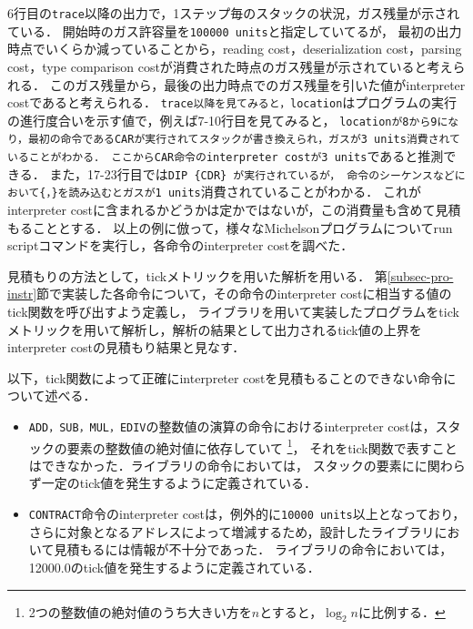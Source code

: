 \documentclass{kuisthesis}
\begin{document}
6行目の{\tt trace}以降の出力で，1ステップ毎のスタックの状況，ガス残量が示されている．
開始時のガス許容量を{\tt 100000\ units}と指定していてるが，
最初の出力時点でいくらか減っていることから，reading cost，deserialization cost，parsing cost，type comparison costが消費された時点のガス残量が示されていると考えられる．
このガス残量から，最後の出力時点でのガス残量を引いた値がinterpreter costであると考えられる．
{\tt trace以降を見てみると，location}はプログラムの実行の進行度合いを示す値で，例えば7-10行目を見てみると，
{\tt locationが8から9になり，最初の命令であるCARが実行されてスタックが書き換えられ，ガスが3\ units消費されていることがわかる．
ここからCAR命令のinterpreter costが3\ units}であると推測できる．
また，17-23行目では{\tt DIP \{CDR\} が実行されているが，
命令のシーケンスなどにおいて\{，\}を読み込むとガスが1\ units}消費されていることがわかる．
これがinterpreter costに含まれるかどうかは定かではないが，この消費量も含めて見積もることとする．
以上の例に倣って，様々なMichelsonプログラムについてrun scriptコマンドを実行し，各命令のinterpreter costを調べた．

見積もりの方法として，tickメトリックを用いた解析を用いる．
第\ref{subsec-pro-instr}節で実装した各命令について，その命令のinterpreter costに相当する値のtick関数を呼び出すよう定義し，
ライブラリを用いて実装したプログラムをtickメトリックを用いて解析し，解析の結果として出力されるtick値の上界をinterpreter costの見積もり結果と見なす．

以下，tick関数によって正確にinterpreter costを見積もることのできない命令について述べる．
\begin{itemize}
  \item {\tt ADD，SUB，MUL，EDIV}の整数値の演算の命令におけるinterpreter costは，スタックの要素の整数値の絶対値に依存していて
  \footnote{2つの整数値の絶対値のうち大きい方を$n$とすると，$\log_2 n$に比例する．}，
  それをtick関数で表すことはできなかった．ライブラリの命令においては，
  スタックの要素にに関わらず一定のtick値を発生するように定義されている．
  \item {\tt CONTRACT}命令のinterpreter costは，例外的に{\tt 10000\ units}以上となっており，
  さらに対象となるアドレスによって増減するため，設計したライブラリにおいて見積もるには情報が不十分であった．
  ライブラリの命令においては，12000.0のtick値を発生するように定義されている．
\end{itemize}
\end{document}
